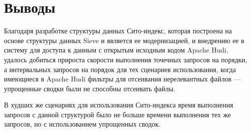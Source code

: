 \newpage
\section*{Выводы}

Благодаря разработке структуры данных Сито-индекс, которая построена на основе структуры данных Sieve и является ее модернизацией, и внедрению ее в систему для доступа к данным с открытым исходным кодом Apache Hudi, удалось добиться прироста скорости выполнения точечных запросов на порядки, а интервальных запросов на порядок для тех сценариев использования, когда имеющиеся в Apache Hudi фильтры для отсеивания нерелевантных файлов --- упрощенные сводки были не способны отсеивать файлы.

В худших же сценариях для использования Сито-индекса время выполнения запросов с данной структурой было не больше времени выполнения тех же запросов, но с использованием упрощенных сводок.
